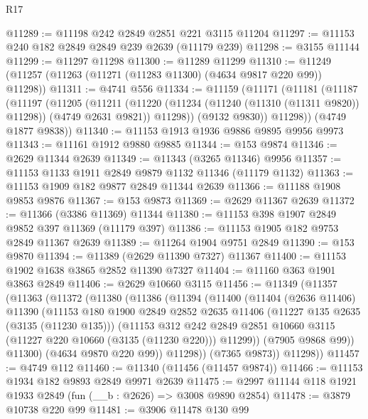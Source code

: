 \begin{lexlean}{R17}
\begin{coremodule}
@11289 := @11198 @242 @2849 @2851 @221 @3115 @11204
@11297 := @11153 @240 @182 @2849 @2849 @239 @2639 (@11179 @239)
@11298 := @3155 @11144
@11299 := @11297 @11298
@11300 := @11289 @11299
@11310 := @11249 (@11257 (@11263 (@11271 (@11283 @11300) (@4634 @9817 @220 @99)) @11298))
@11311 := @4741 @556
@11334 := @11159
    (@11171
      (@11181
        (@11187
          (@11197
            (@11205
              (@11211
                (@11220 (@11234 (@11240 (@11310 (@11311 @9820)) @11298)) (@4749 @2631 @9821))
                @11298))
            (@9132 @9830))
          @11298))
      (@4749 @1877 @9838))
@11340 := @11153 @1913 @1936 @9886 @9895 @9956 @9973
@11343 := @11161 @1912 @9880 @9885
@11344 := @153 @9874
@11346 := @2629 @11344 @2639
@11349 := @11343 (@3265 @11346) @9956
@11357 := @11153 @1133 @1911 @2849 @9879 @1132 @11346 (@11179 @1132)
@11363 := @11153 @1909 @182 @9877 @2849 @11344 @2639
@11366 := @11188 @1908 @9853 @9876
@11367 := @153 @9873
@11369 := @2629 @11367 @2639
@11372 := @11366 (@3386 @11369) @11344
@11380 := @11153 @398 @1907 @2849 @9852 @397 @11369 (@11179 @397)
@11386 := @11153 @1905 @182 @9753 @2849 @11367 @2639
@11389 := @11264 @1904 @9751 @2849
@11390 := @153 @9870
@11394 := @11389 (@2629 @11390 @7327) @11367
@11400 := @11153 @1902 @1638 @3865 @2852 @11390 @7327
@11404 := @11160 @363 @1901 @3863 @2849
@11406 := @2629 @10660 @3115
@11456 := @11349
    (@11357
      (@11363
        (@11372
          (@11380
            (@11386
              (@11394
                (@11400
                  (@11404
                    (@2636 @11406)
                    @11390
                    (@11153
                      @180
                      @1900
                      @2849
                      @2852
                      @2635
                      @11406
                      (@11227 @135 @2635 (@3135 (@11230 @135)))
                      (@11153
                        @312
                        @242
                        @2849
                        @2851
                        @10660
                        @3115
                        (@11227 @220 @10660 (@3135 (@11230 @220)))
                        @11299))
                    (@7905 @9868 @99))
                  @11300)
                (@4634 @9870 @220 @99))
              @11298))
          (@7365 @9873))
        @11298))
@11457 := @4749 @112
@11460 := @11340 (@11456 (@11457 @9874))
@11466 := @11153 @1934 @182 @9893 @2849 @9971 @2639
@11475 := @2997 @11144 @118 @1921 @1933 @2849 (fun (__b : @2626) => @3008 @9890 @2854)
@11478 := @3879 @10738 @220 @99
@11481 := @3906 @11478 @130 @99

\end{coremodule}
\end{lexlean}
